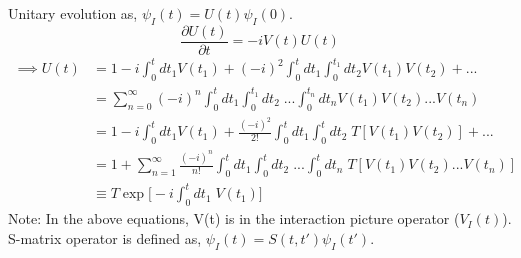 \documentclass{article}
\begin{document}
Unitary evolution as, $\psi_I(t) = U(t) \psi_I(0)$.\\
\begin{equation}
    \frac{\partial U(t)}{\partial t} = -iV(t) U(t)
\end{equation}
\begin{equation}
\begin{split}
     \implies U(t) &= 1-i\int_0^t dt_1 V(t_1) +(-i)^2 \int_0^t dt_1 \int_0^{t_1} dt_2 V(t_1)  V(t_2)+... \\&= \sum_{n=0}^{\infty} (-i)^n \int_0^{t}dt_1\int_0^{t_1}dt_2 \; ... \int_0^{t_n}dt_n V(t_1)  V(t_2)... V(t_n) \\
     &= 1-i\int_0^t dt_1 V(t_1) +\frac{(-i)^2}{2!} \int_0^t dt_1 \int_0^{t} dt_2 \; T[V(t_1)  V(t_2)]+... \\&=1 + \sum_{n=1}^{\infty} \frac{(-i)^n}{n!} \int_0^{t}dt_1\int_0^{t}dt_2 \; ... \int_0^{t}dt_n \; T[V(t_1)  V(t_2)... V(t_n)] \\ &\equiv T\exp \bigg[-i\int_0^t dt_1\; V(t_1)\bigg]
\end{split}
\end{equation}
Note: In the above equations, V(t) is in the interaction picture operator ($V_I(t)$).\\
S-matrix operator is defined as,  $\psi_I(t) = S(t,t') \psi_I(t')$. 
\end{document}
